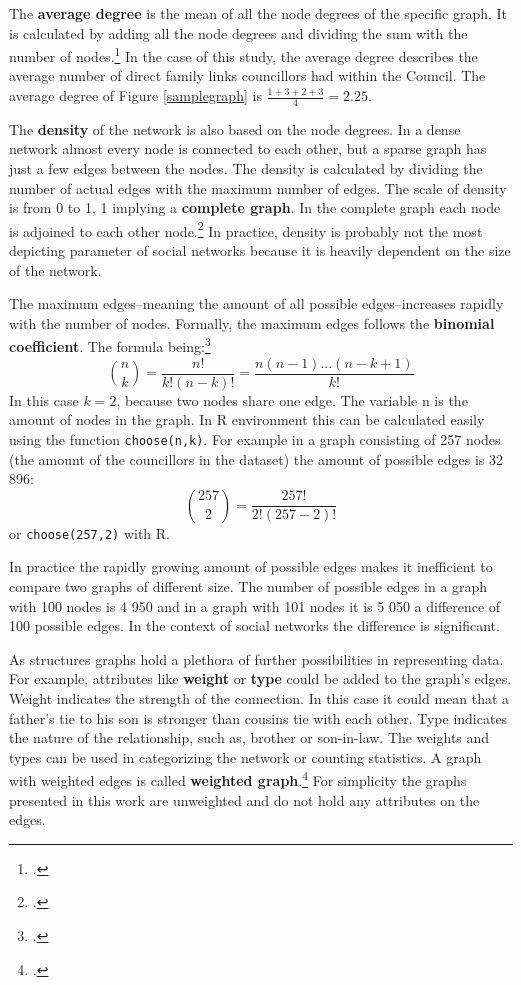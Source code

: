 The \textbf{average degree} is the mean of all the node degrees of the specific graph. It is calculated by adding all the node degrees and dividing the sum with the number of nodes.\footcite[pp. 3-4.]{RajPM2018} In the case of this study, the average degree describes the average number of direct family links councillors had within the Council. The average degree of Figure \ref{samplegraph} is $\frac{1 + 3 + 2 + 3}{4} = 2.25$.

The \textbf{density} of the network is also based on the node degrees. In a dense network almost every node is connected to each other, but a sparse graph has just a few edges between the nodes. The density is calculated by dividing the number of actual edges with the maximum number of edges. The scale of density is from 0 to 1, 1 implying a \textbf{complete graph}. In the complete graph each node is adjoined to each other node.\footcite[pp. 5-6.]{RajPM2018} In practice, density is probably not the most depicting parameter of social networks because it is heavily dependent on the size of the network. 

The maximum edges–meaning the amount of all possible edges–increases rapidly with the number of nodes. Formally, the maximum edges follows the \textbf{binomial coefficient}. The formula being:\footcites[p. 16.]{laininen2002}[pp. 5-6.]{RajPM2018}
\begin{equation*}
\binom{n}{k} = \frac{n!}{k!(n-k)!} = \frac{n(n-1)...(n-k+1)}{k!}
\end{equation*}
In this case $k = 2$, because two nodes share one edge. The variable n is the amount of nodes in the graph. In R environment this can be calculated easily using the function \texttt{choose(n,k)}. For example in a graph consisting of 257 nodes (the amount of the councillors in the dataset) the amount of possible edges is 32 896:
\begin{equation*}
\binom{257}{2} = \frac{257!}{2!(257-2)!}
\end{equation*}
or \texttt{choose(257,2)} with R.

In practice the rapidly growing amount of possible edges makes it inefficient to compare two graphs of different size. The number of possible edges in a graph with 100 nodes is 4 950 and in a graph with 101 nodes it is 5 050 a difference of 100 possible edges. In the context of social networks the difference is significant.

As structures graphs hold a plethora of further possibilities in representing data. For example, attributes like \textbf{weight} or \textbf{type} could be added to the graph's edges. Weight indicates the strength of the connection. In this case it could mean that a father's tie to his son is stronger than cousins tie with each other. Type indicates the nature of the relationship, such as, brother or son-in-law. The weights and types can be used in categorizing the network or counting statistics. A graph with weighted edges is called \textbf{weighted graph}.\footcite[pp. 11-12.]{RajPM2018} For simplicity the graphs presented in this work are unweighted and do not hold any attributes on the edges. 

